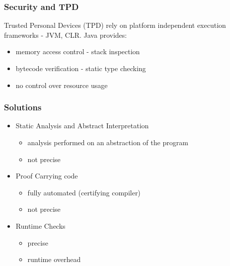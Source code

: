 \documentclass{beamer}
\begin{document}
\begin{frame}
\frametitle{Security and TPD}
   Trusted Personal Devices (TPD) rely on platform independent execution frameworks - JVM, CLR.
   Java provides:
       \begin{itemize}  
	   \item  memory access control - stack inspection
	    \item bytecode verification - static type checking
	     \item \alert{no control over resource usage }
	 \end{itemize}
\end{frame}

\begin{frame} \frametitle{Solutions }

\begin{itemize}
     \item Static Analysis and Abstract Interpretation
        \begin{itemize}
	  \item analysis performed on an abstraction of the program
	  \item not precise
	\end{itemize}
	\pause
     \item Proof Carrying code 
        \begin{itemize}
	  \item fully automated (certifying  compiler)
	  \item not precise
        \end{itemize}
        \pause
     \item Runtime Checks 
        \begin{itemize}
	  \item precise 
	  \item runtime overhead
	\end{itemize}
\end{itemize}
\end{frame}
\end{document}
